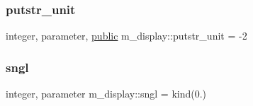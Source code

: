 \subsubsection{\texorpdfstring{putstr\+\_\+unit}{putstr\_unit}}
{\footnotesize\ttfamily integer, parameter, \hyperlink{M__stopwatch_83_8txt_a2f74811300c361e53b430611a7d1769f}{public} m\+\_\+display\+::putstr\+\_\+unit = -\/2}

\mbox{\label{namespacem__display_a2ac86bc535c3ccc5947dbb3109c666b5}} 
\subsubsection{\texorpdfstring{sngl}{sngl}}
{\footnotesize\ttfamily integer, parameter m\+\_\+display\+::sngl = kind(0.)\hspace{0.3cm}{\ttfamily [private]}}

